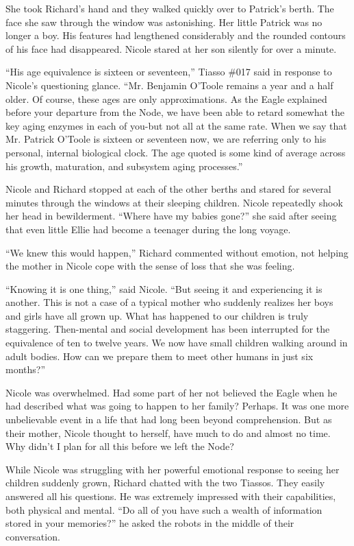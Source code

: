 \documentclass[]{article}
\begin{document}
{She took Richard’s hand and they walked quickly over to Patrick’s berth.  The face she saw through the window was astonishing.  Her little Patrick was no longer a boy.  His features had lengthened considerably and the rounded contours of his face had disappeared.  Nicole stared at her son silently for over a minute.

“His age equivalence is sixteen or seventeen,” Tiasso \#017 said in response to Nicole’s questioning glance.  “Mr.  Benjamin O’Toole remains a year and a half older.  Of course, these ages are only approximations.  As the Eagle explained before your departure from the Node, we have been able to retard somewhat the key aging enzymes in each of you-but not all at the same rate.  When we say that Mr.  Patrick O’Toole is sixteen or seventeen now, we are referring only to his personal, internal biological clock.  The age quoted is some kind of average across his growth, maturation, and subsystem aging processes.”

Nicole and Richard stopped at each of the other berths and stared for several minutes through the windows at their sleeping children.  Nicole repeatedly shook her head in bewilderment.  “Where have my babies gone?” she said after seeing that even little Ellie had become a teenager during the long voyage.

“We knew this would happen,” Richard commented without emotion, not helping the mother in Nicole cope with the sense of loss that she was feeling.

“Knowing it is one thing,” said Nicole.  “But seeing it and experiencing it is another.  This is not a case of a typical mother who suddenly realizes her boys and girls have all grown up.  What has happened to our children is truly staggering.  Then-mental and social development has been interrupted for the equivalence of ten to twelve years.  We now have small children walking around in adult bodies.  How can we prepare them to meet other humans in just six months?”

Nicole was overwhelmed.  Had some part of her not believed the Eagle when he had described what was going to happen to her family? Perhaps.  It was one more unbelievable event in a life that had long been beyond comprehension.  But as their mother, Nicole thought to herself, have much to do and almost no time.  Why didn’t I plan for all this before we left the Node?

While Nicole was struggling with her powerful emotional response to seeing her children suddenly grown, Richard chatted with the two Tiassos.  They easily answered all his questions.  He was extremely impressed with their capabilities, both physical and mental.  “Do all of you have such a wealth of information stored in your memories?” he asked the robots in the middle of their conversation.

}
\end{document}
